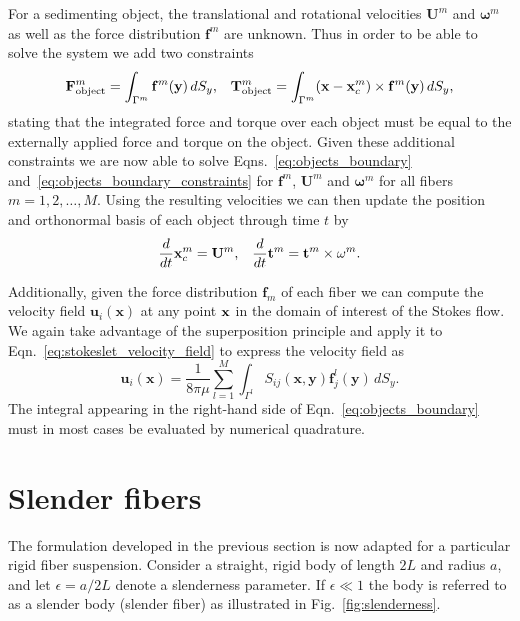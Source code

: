 For a sedimenting object, the translational and rotational velocities $\mathbf{U}^m$ and $\mathbf{\omega}^m$ as well as the force distribution $\mathbf{f}^m$ are unknown. Thus in order to be able to solve the system we add two constraints
\begin{equation}
	\label{eq:objects_boundary_constraints}
	\mathbf{F}_{\text{object}}^m = \int_{\Gamma^m} \mathbf{f}^m(\mathbf{y}) \, dS_y\text{,} \quad \mathbf{T}_{\text{object}}^m = \int_{\Gamma^m} (\mathbf{x} - \mathbf{x}_c^m) \times \mathbf{f}^m(\mathbf{y}) \, dS_y \text{,}
\end{equation}
stating that the integrated force and torque over each object must be equal to the externally applied force and torque on the object. Given these additional constraints we are now able to solve Eqns.~\eqref{eq:objects_boundary} and~\eqref{eq:objects_boundary_constraints} for $\mathbf{f}^m$, $\mathbf{U}^m$ and $\mathbf{\omega}^m$ for all fibers $m=1,2,\dots,M$. Using the resulting velocities we can then update the position and orthonormal basis of each object through time $t$ by
\begin{equation}
	\label{eq:objects_update}
	\frac{d}{dt}\mathbf{x}_c^m = \mathbf{U}^m \text{,} \quad \frac{d}{dt}\mathbf{t}^m = \mathbf{t}^m \times \mathbf{\omega}^m \text{.}
\end{equation}

Additionally, given the force distribution $\mathbf{f}_m$ of each fiber we can compute the velocity field $\mathbf{u}_i(\mathbf{x})$ at any point $\mathbf{x}$ in the domain of interest of the Stokes flow. We again take advantage of the superposition principle and apply it to Eqn.~\eqref{eq:stokeslet_velocity_field} to express the velocity field as
\begin{equation}
	\label{eq:objects_velocity_field}
	\mathbf{u}_i(\mathbf{x}) = \frac{1}{8 \pi \mu} \sum_{l=1}^M \int_{\Gamma^l} S_{ij}(\mathbf{x},\mathbf{y})\mathbf{f}_j^l(\mathbf{y}) \, dS_y\text{.}
\end{equation}
The integral appearing in the right-hand side of Eqn.~\eqref{eq:objects_boundary} must in most cases be evaluated by numerical quadrature.

\section{Slender fibers}
\label{sec:slender_fibers}

The formulation developed in the previous section is now adapted for a particular rigid fiber suspension. Consider a straight, rigid body of length $2L$ and radius $a$, and let $\epsilon = a / 2 L$ denote a slenderness parameter. If $\epsilon \ll 1$ the body is referred to as a slender body (slender fiber) as illustrated in Fig.~\ref{fig:slenderness}.


